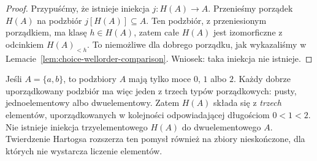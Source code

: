 \begin{proof}
Przypuśćmy, że istnieje iniekcja $j:H(A)\to A$.
Przenieśmy porządek $H(A)$ na podzbiór $j[H(A)]\subseteq A$.
Ten podzbiór, z przeniesionym porządkiem, ma klasę
$h\in H(A)$, zatem całe $H(A)$ jest izomorficzne
z odcinkiem $H(A)_{<h}$. To niemożliwe dla dobrego
porządku, jak wykazaliśmy w Lemacie~\ref{lem:choice-wellorder-comparison}.
Wniosek: taka iniekcja nie istnieje.
\end{proof}

\begin{przyklad}
Jeśli $A=\{a,b\}$, to podzbiory $A$ mają tylko
moce $0$, $1$ albo $2$. Każdy dobrze uporządkowany
podzbiór ma więc jeden z trzech typów porządkowych:
pusty, jednoelementowy albo dwuelementowy.
Zatem $H(A)$ składa się z \emph{trzech} elementów,
uporządkowanych w kolejności odpowiadającej długościom
$0<1<2$. Nie istnieje iniekcja trzyelementowego
$H(A)$ do dwuelementowego $A$. Twierdzenie Hartogsa
rozszerza ten pomysł również na zbiory nieskończone,
dla których nie wystarcza liczenie elementów.
\end{przyklad}

